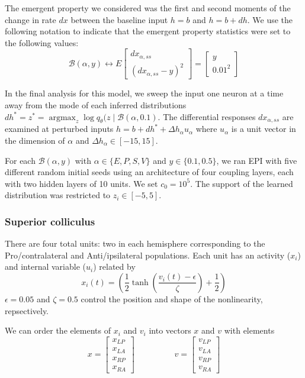 \documentclass[11pt]{article}
\DeclareMathOperator*{\argmax}{argmax}
\begin{document}
The emergent property we considered was the first and second moments of the change in rate $dx$ between the baseline input $h= b$ and $h = b + dh$.  We use the following notation to indicate that the emergent property statistics were set to the following values:
\begin{equation}
\mathcal{B}(\alpha, y) \leftrightarrow 
E \begin{bmatrix} dx_{\alpha,ss} \\ (dx_{\alpha,ss} - y)^2 \end{bmatrix} = \begin{bmatrix} y \\ 0.01^2 \end{bmatrix}
\end{equation}

In the final analysis for this model, we sweep the input one neuron at a time away from the mode of each inferred distributions $dh^* = z^* = \argmax_{z} \log q_\theta(z \mid \mathcal{B}(\alpha, 0.1)$.
The differential responses $dx_{\alpha,ss}$ are examined at perturbed inputs  $h = b + dh^* + \Delta h_\alpha u_\alpha$ where $u_\alpha$ is a unit vector in the dimension of $\alpha$ and $\Delta h_\alpha \in \left[-15,15\right]$.

For each $\mathcal{B}(\alpha, y)$ with $\alpha \in \{E, P, S, V\}$ and $y \in \{0.1, 0.5\}$, we ran EPI with five different random initial seeds using an architecture of four coupling layers, each with two hidden layers of 10 units.  We set $c_0 = 10^5$.  The support of the learned distribution was restricted to $z_i \in \left[-5, 5\right]$.


\subsubsection{Superior colliculus}\label{methods_SC}
There are four total units: two in each hemisphere corresponding to the Pro/contralateral and Anti/ipsilateral populations.  Each unit has an activity ($x_i$) and internal variable ($u_i$) related by
\begin{equation}
x_i(t) =\left(\frac{1}{2}\tanh\left(\frac{v_i(t) - \epsilon}{\zeta}\right)+ \frac{1}{2} \right)
\end{equation}
$\epsilon = 0.05$ and $\zeta = 0.5$ control the position and shape of the nonlinearity, repsectively.

We can order the elements of $x_i$ and $v_i$ into vectors $x$ and $v$ with elements
\begin{equation}
x = \begin{bmatrix} x_{LP} \\ x_{LA} \\ x_{RP} \\ x_{RA} \end{bmatrix} \hspace{2cm} v = \begin{bmatrix} v_{LP} \\ v_{LA} \\ v_{RP} \\ v_{RA} \end{bmatrix}
\end{equation}
\end{document}
